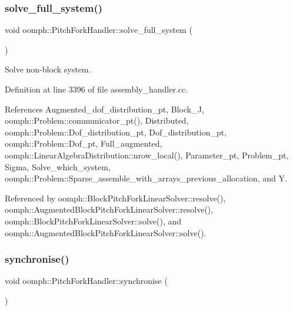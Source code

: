 \subsubsection{\texorpdfstring{solve\+\_\+full\+\_\+system()}{solve\_full\_system()}}
{\footnotesize\ttfamily void oomph\+::\+Pitch\+Fork\+Handler\+::solve\+\_\+full\+\_\+system (\begin{DoxyParamCaption}{ }\end{DoxyParamCaption})}



Solve non-\/block system. 



Definition at line 3396 of file assembly\+\_\+handler.\+cc.



References Augmented\+\_\+dof\+\_\+distribution\+\_\+pt, Block\+\_\+J, oomph\+::\+Problem\+::communicator\+\_\+pt(), Distributed, oomph\+::\+Problem\+::\+Dof\+\_\+distribution\+\_\+pt, Dof\+\_\+distribution\+\_\+pt, oomph\+::\+Problem\+::\+Dof\+\_\+pt, Full\+\_\+augmented, oomph\+::\+Linear\+Algebra\+Distribution\+::nrow\+\_\+local(), Parameter\+\_\+pt, Problem\+\_\+pt, Sigma, Solve\+\_\+which\+\_\+system, oomph\+::\+Problem\+::\+Sparse\+\_\+assemble\+\_\+with\+\_\+arrays\+\_\+previous\+\_\+allocation, and Y.



Referenced by oomph\+::\+Block\+Pitch\+Fork\+Linear\+Solver\+::resolve(), oomph\+::\+Augmented\+Block\+Pitch\+Fork\+Linear\+Solver\+::resolve(), oomph\+::\+Block\+Pitch\+Fork\+Linear\+Solver\+::solve(), and oomph\+::\+Augmented\+Block\+Pitch\+Fork\+Linear\+Solver\+::solve().

\mbox{\label{classoomph_1_1PitchForkHandler_a23a67d7212e25108e40cf9b4606f4478}} 
\subsubsection{\texorpdfstring{synchronise()}{synchronise()}}
{\footnotesize\ttfamily void oomph\+::\+Pitch\+Fork\+Handler\+::synchronise (\begin{DoxyParamCaption}{ }\end{DoxyParamCaption})\hspace{0.3cm}{\ttfamily [virtual]}}




